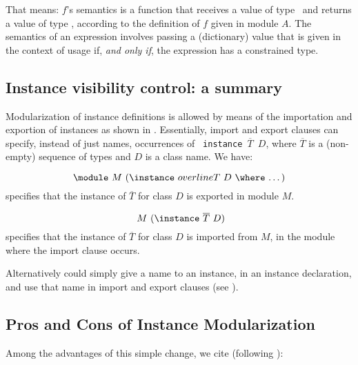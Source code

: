 That means: $f$'s semantics is a function that receives a value of
type \String\ and returns a value of type \String, according to the
definition of $f$ given in module $A$. The semantics of an expression
involves passing a (dictionary) value that is given in the context of
usage if, {\em and only if}, the expression has a constrained type.

\subsection{Instance visibility control: a summary}
\label{subsec:instance-visibility-control}

Modularization of instance definitions is allowed by means of the
importation and exportion of instances as shown in
\cite{Controlling-scope-instances}. Essentially, import and export
clauses can specify, instead of just names, occurrences of {\tt
  instance $\overline{T}$ $D$}, where $\overline{T}$ is a (non-empty)
sequence of types and $D$ is a class name.  We have:

  \[ \text{\module\ $M$ (\instance\ $overline{T}$ $D$ \where\ \ldots)} \]
specifies that the instance of $\overline{T}$ for class $D$ is
exported in module $M$.

  \[ \text{\ $M$ (\instance\ $\overline{T}$ $D$)} \]
specifies that the instance of $\overline{T}$ for class $D$ is
imported from $M$, in the module where the import clause occurs.

Alternatively could simply give a name to an instance, in an instance
declaration, and use that name in import and export clauses (see
\cite{Controlling-scope-instances}).

\subsection{Pros and Cons of Instance Modularization}

Among the advantages of this simple change, we cite (following
\cite{Controlling-scope-instances}):

